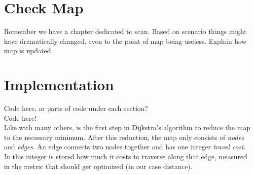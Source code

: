 \section{Check Map}
\label{sec:map_check} %
Remember we have a chapter dedicated to scan.\linebreak
Based on scenario things might have dramatically changed, even to the point of map being useless. Explain how map is updated.

\section{Implementation}
\label{sec:map} %
Code here, or parts of code under each section?\\
Code here!
\\
Like with many others,
is the first step in Dijkstra's algorithm to reduce the map to the necessary minimum.
After this reduction, the map only consists of \emph{nodes} and \emph{edges}.
An edge connects two nodes together and has one integer \emph{travel cost}.
In this integer is stored how much it costs to traverse along that edge,
measured in the metric that should get optimized (in our case distance).


